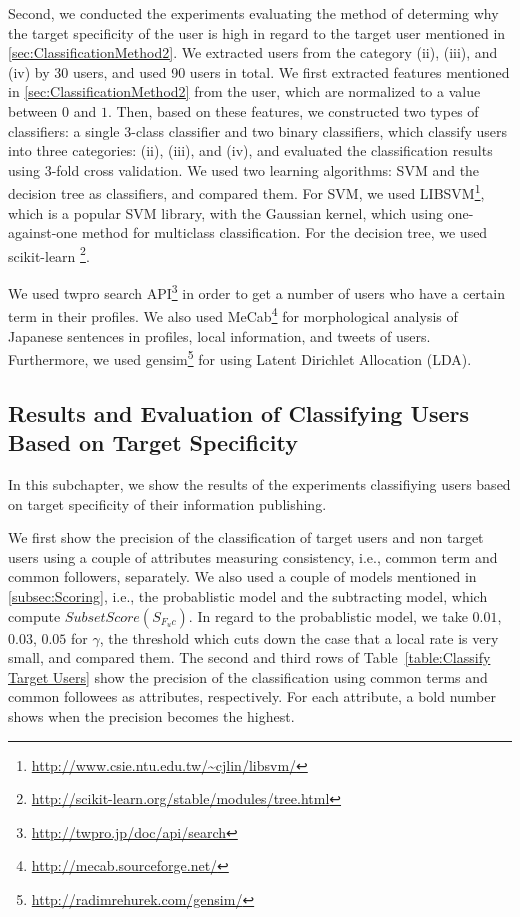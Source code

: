 Second, we conducted the experiments evaluating the method of determing
why the target specificity of the user is high in regard to the target
user mentioned in \ref{sec:ClassificationMethod2}.  We extracted users
from the category (ii), (iii), and (iv) by 30 users, and used 90 users
in total.  We first extracted features mentioned in
\ref{sec:ClassificationMethod2} from the user, which are normalized to a
value between $0$ and $1$.  Then, based on these features, we
constructed two types of classifiers: a single 3-class classifier and
two binary classifiers, which classify users into three categories:
(ii), (iii), and (iv), and evaluated the classification results using
3-fold cross validation.  We used two learning algorithms: SVM and the
decision tree as classifiers, and compared them.  For SVM, we used
LIBSVM\footnote{\url{http://www.csie.ntu.edu.tw/~cjlin/libsvm/}}, which
is a popular SVM library, with the Gaussian kernel, which using
one-against-one method for multiclass classification.  For the decision
tree, we used scikit-learn
\footnote{\url{http://scikit-learn.org/stable/modules/tree.html}}.

We used twpro search API\footnote{\url{http://twpro.jp/doc/api/search}}
in order to get a number of users who have a certain term in their
profiles.  We also used
MeCab\footnote{\url{http://mecab.sourceforge.net/}} for morphological
analysis of Japanese sentences in profiles, local information, and
tweets of users.  Furthermore, we used
gensim\footnote{\url{http://radimrehurek.com/gensim/}} for using Latent
Dirichlet Allocation (LDA).

\subsection{Results and Evaluation of Classifying Users Based on Target
  Specificity}
\label{subsec:Results of Method1}

In this subchapter, we show the results of the experiments classifiying
users based on target specificity of their information publishing.

We first show the precision of the classification of target users and
non target users using a couple of attributes measuring consistency,
i.e., common term and common followers, separately.  We also used a
couple of models mentioned in \ref{subsec:Scoring}, i.e., the
probablistic model and the subtracting model, which compute
$\mathit{SubsetScore}(S_{F_uc})$.  In regard to the probablistic model,
we take $0.01$, $0.03$, $0.05$ for $\gamma$, the threshold which cuts
down the case that a local rate is very small, and
compared them.  The second and third rows of Table~\ref{table:Classify
Target Users} show the precision of the classification using common
terms and common followees as attributes, respectively.  For each
attribute, a bold number shows when the precision becomes the highest.


